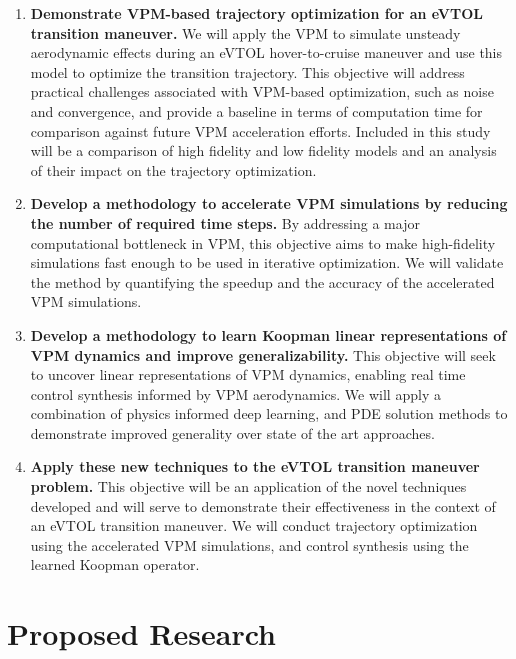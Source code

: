 \documentclass[12pt, letterpaper]{article}
\begin{document}
\begin{enumerate}
    \item \textbf{Demonstrate VPM-based trajectory optimization for an eVTOL transition maneuver.} 
    We will apply the VPM to simulate unsteady aerodynamic effects during an eVTOL hover-to-cruise maneuver and use this model to optimize the transition trajectory. This objective will address practical challenges associated with VPM-based optimization, such as noise and convergence, and provide a baseline in terms of computation time for comparison against future VPM acceleration efforts.  Included in this study will be a comparison of high fidelity and low fidelity models and an analysis of their impact on the trajectory optimization.
    \item \textbf{Develop a methodology to accelerate VPM simulations by reducing the number of required time steps.} 
    By addressing a major computational bottleneck in VPM, this objective aims to make high-fidelity simulations fast enough to be used in iterative optimization. We will validate the method by quantifying the speedup and the accuracy of the accelerated VPM simulations. 

    \item \textbf{Develop a methodology to learn Koopman linear representations of VPM dynamics and improve generalizability.} 
    This objective will seek to uncover linear representations of VPM dynamics, enabling real time control synthesis informed by VPM aerodynamics.  We will apply a combination of physics informed deep learning, and PDE solution methods to demonstrate improved generality over state of the art approaches.  


    \item \textbf{Apply these new techniques to the eVTOL transition maneuver problem.}
    This objective will be an application of the novel techniques developed and will serve to demonstrate their effectiveness in the context of an eVTOL transition maneuver.  We will conduct trajectory optimization using the accelerated VPM simulations, and control synthesis using the learned Koopman operator.
\end{enumerate}



\section{Proposed Research}
\end{document}
